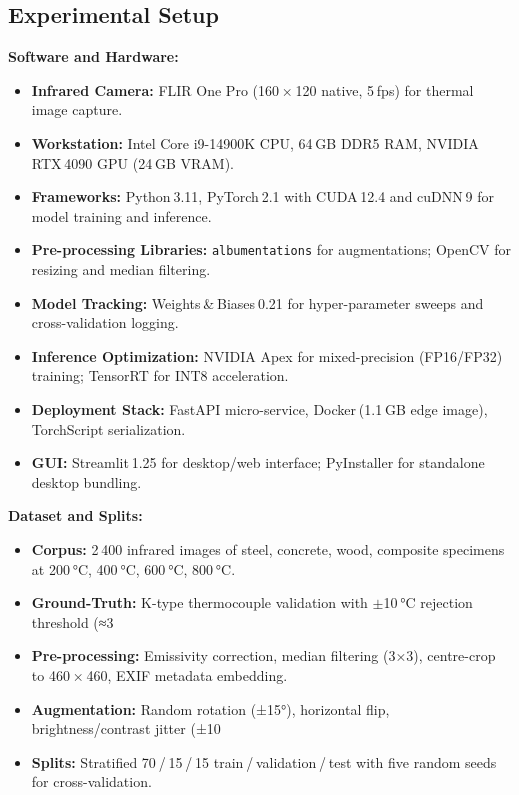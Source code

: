 \subsection{Experimental Setup}

\noindent\textbf{Software and Hardware:}
\begin{itemize}
    \item \textbf{Infrared Camera:} FLIR One Pro (160 × 120 native, 5 fps) for thermal image capture.
    \item \textbf{Workstation:} Intel Core i9-14900K CPU, 64 GB DDR5 RAM, NVIDIA RTX 4090 GPU (24 GB VRAM).
    \item \textbf{Frameworks:} Python 3.11, PyTorch 2.1 with CUDA 12.4 and cuDNN 9 for model training and inference.
    \item \textbf{Pre-processing Libraries:} \texttt{albumentations} for augmentations; OpenCV for resizing and median filtering.
    \item \textbf{Model Tracking:} Weights & Biases 0.21 for hyper-parameter sweeps and cross-validation logging.
    \item \textbf{Inference Optimization:} NVIDIA Apex for mixed-precision (FP16/FP32) training; TensorRT for INT8 acceleration.
    \item \textbf{Deployment Stack:} FastAPI micro-service, Docker (1.1 GB edge image), TorchScript serialization.
    \item \textbf{GUI:} Streamlit 1.25 for desktop/web interface; PyInstaller for standalone desktop bundling.
\end{itemize}

\noindent\textbf{Dataset and Splits:}
\begin{itemize}
    \item \textbf{Corpus:} 2 400 infrared images of steel, concrete, wood, composite specimens at 200 °C, 400 °C, 600 °C, 800 °C.
    \item \textbf{Ground-Truth:} K-type thermocouple validation with $\pm$10 °C rejection threshold (≈3 %
    \item \textbf{Pre-processing:} Emissivity correction, median filtering (3×3), centre-crop to 460 × 460, EXIF metadata embedding.
    \item \textbf{Augmentation:} Random rotation (±15°), horizontal flip, brightness/contrast jitter (±10 %
    \item \textbf{Splits:} Stratified 70 / 15 / 15 train / validation / test with five random seeds for cross-validation.
\end{itemize}


